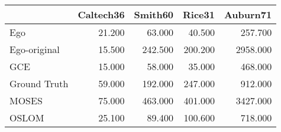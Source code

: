 \begin{tabular}{lrrrr}
\toprule
{} & Caltech36 & Smith60 &  Rice31 & Auburn71 \\
\midrule
Ego          &    21.200 &  63.000 &  40.500 &  257.700 \\
Ego-original &    15.500 & 242.500 & 200.200 & 2958.000 \\
GCE          &    15.000 &  58.000 &  35.000 &  468.000 \\
Ground Truth &    59.000 & 192.000 & 247.000 &  912.000 \\
MOSES        &    75.000 & 463.000 & 401.000 & 3427.000 \\
OSLOM        &    25.100 &  89.400 & 100.600 &  718.000 \\
\bottomrule
\end{tabular}
